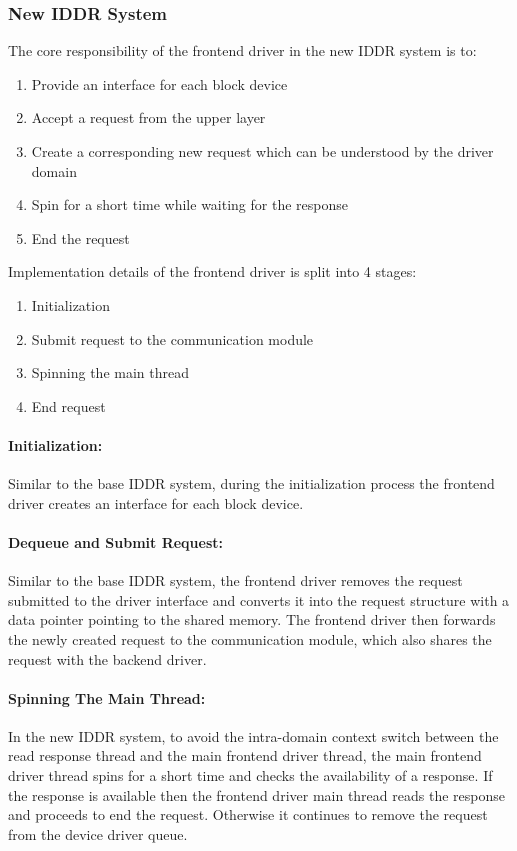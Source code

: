 \subsubsection*{New IDDR System}
The core responsibility of the frontend driver in the new IDDR system is to:
\begin{enumerate}
\item Provide an interface for each block device
\item Accept a request from the upper layer
\item Create a corresponding new request which can be understood by the driver domain
\item Spin for a short time while waiting for the response
\item End the request
\end{enumerate}

Implementation details of the frontend driver is split into 4 stages:
\begin{enumerate}
\item Initialization
\item Submit request to the communication module
\item Spinning the main thread
\item End request
\end{enumerate}

\paragraph{Initialization:}
Similar to the base IDDR system, during the initialization process the frontend driver creates an interface for each block device.

\paragraph{Dequeue and Submit Request:}
Similar to the base IDDR system, the frontend driver removes the request submitted to the driver interface and converts it into the request structure with a data pointer pointing to the shared memory. The frontend driver then forwards the newly created request to the communication module, which also shares the request with the backend driver.

\paragraph{Spinning The Main Thread:}
In the new IDDR system, to avoid the intra-domain context switch between the read response thread and the main frontend driver thread, the main frontend driver thread spins for a short time and checks the availability of a response. If the response is available then the frontend driver main thread reads the response and proceeds to end the request. Otherwise it continues to remove the request from the device driver queue.

